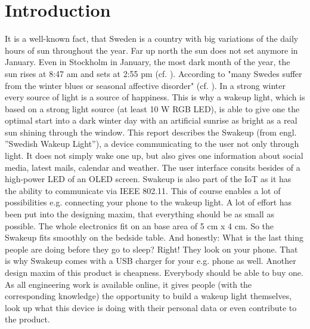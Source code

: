\chapter{Introduction} 
\label{chap:introduction} 
It is a well-known fact, that Sweden is a country with big variations of the
daily hours of sun throughout the year. Far up north the sun does not set
anymore in January. Even in Stockholm in January, the most dark month of the
year, the sun rises at 8:47 am and sets at 2:55 pm
(cf. \cite{other:visitsweden}). According to  "many Swedes
suffer from the winter blues or seasonal affective disorder" (cf.
\cite{other:sverigesradio}). In a strong winter every source of light is a
source of happiness. This is why a wakeup light, which is based on a strong
light source (at least 10 W RGB LED), is able to give one the optimal start into
a dark winter day with an artificial sunrise as bright as a real sun shining
through the window.  
\newpar
This report describes the Swakeup (from engl. ”Swedish Wakeup Light”), a device
communicating to the user not only through light. It does not simply wake one
up, but also gives one information about social media, latest mails, calendar
and weather. The user interface consits besides of a high-power LED of an OLED
screen. Swakeup is also part of the IoT as it has the ability to communicate via
IEEE 802.11. This of course enables a lot of possibilities e.g. connecting your
phone to the wakeup light. A lot of effort has been put into the designing
maxim, that everything should be as small as possible. The whole electronics fit
on an base area of 5 cm x 4 cm. So the Swakeup fits smoothly on the bedside
table. And honestly: What is the last thing people are doing before they go to
sleep? Right! They look on your phone. That is why Swakeup comes with a USB
charger for your e.g. phone as well. Another design maxim of this product is
cheapness. Everybody should be able to buy one. As all engineering work is
available online, it gives people (with the corresponding knowledge) the
opportunity to build a wakeup light themselves, look up what this device is
doing with their personal data or even contribute to the product.
